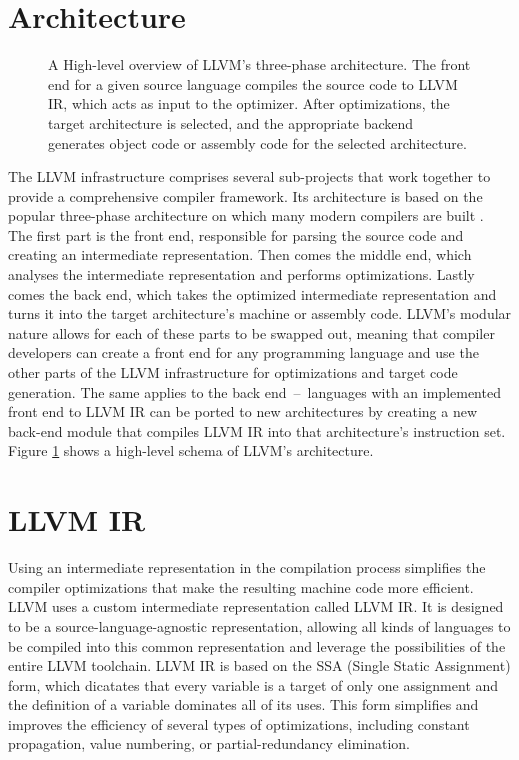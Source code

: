 \section{Architecture}

\begin{figure}
    \centering
    
    \caption{A High-level overview of LLVM's three-phase architecture. The front end for a given source language compiles the source code to LLVM IR, which acts as input to the optimizer. After optimizations, the target architecture is selected, and the appropriate backend generates object code or assembly code for the selected architecture. \cite{architecture-of-os-applications}}
    \label{fig:llvm-arch}
\end{figure}

The LLVM infrastructure comprises several sub-projects that work together to provide a comprehensive compiler framework. Its architecture is based on the popular three-phase architecture on which many modern compilers are built \cite{architecture-of-os-applications}. The first part is the front end, responsible for parsing the source code and creating an intermediate representation. Then comes the middle end, which analyses the intermediate representation and performs optimizations. Lastly comes the back end, which takes the optimized intermediate representation and turns it into the target architecture's machine or assembly code. LLVM's modular nature allows for each of these parts to be swapped out, meaning that compiler developers can create a front end for any programming language and use the other parts of the LLVM infrastructure for optimizations and target code generation. The same applies to the back end \,--\, languages with an implemented front end to LLVM IR can be ported to new architectures by creating a new back-end module that compiles LLVM IR into that architecture's instruction set. Figure \ref{fig:llvm-arch} shows a high-level schema of LLVM's architecture.

\section{LLVM IR}

Using an intermediate representation in the compilation process simplifies the compiler optimizations that make the resulting machine code more efficient. LLVM uses a custom intermediate representation called LLVM IR. It is designed to be a source-language-agnostic representation, allowing all kinds of languages to be compiled into this common representation and leverage the possibilities of the entire LLVM toolchain. LLVM IR is based on the SSA (Single Static Assignment) form, which dicatates that every variable is a target of only one assignment and the definition of a variable dominates all of its uses. This form simplifies and improves the efficiency of several types of optimizations, including constant propagation, value numbering, or partial-redundancy elimination. \cite{advanced-compiler-design}

